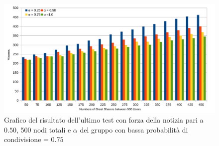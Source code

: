 \begin{figure}[!ht]
\centerline {
  \includegraphics[width=1.1\textwidth]{charts/last-test-str_0.5.pdf}
}
\caption{Grafico del risultato dell'ultimo test con forza della notizia pari a $0.50$, 
500 nodi totali e $\alpha$ del gruppo con bassa probabilità di condivisione = $0.75$}
\label{img:last_test_str_0_5}
\end{figure}











